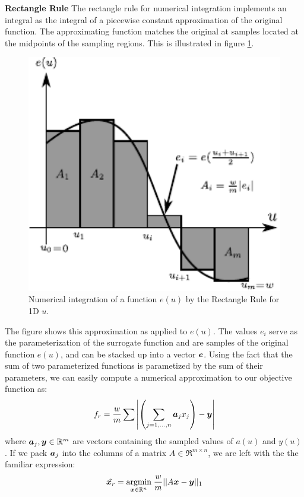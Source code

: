 \documentclass[12pt,journal,draftcls,letterpaper,onecolumn]{IEEEtran}
\begin{document}
{\bf Rectangle Rule} The rectangle rule for numerical integration implements an integral as the integral of a piecewise constant approximation of the original function.  The approximating function matches the original at samples located at the midpoints of the sampling regions. This is illustrated in figure \ref{fig:rectangle}.
\begin{figure}
 \centering
 \includegraphics[width=5in]{integration_rectangle_midpoint.pdf}
 \caption{Numerical integration of a function $e(u)$ by the Rectangle Rule for 1D $u$.}
 \label{fig:rectangle}
\end{figure}
The figure shows this approximation as applied to $e(u)$. The values $e_i$ serve as the parameterization of the surrogate function and are samples of the original function $e(u)$, and can be stacked up into a vector $\boldsymbol{e}$.  Using the fact that the sum of two parameterized functions is parametized by the sum of their parameters, we can easily compute a numerical approximation to our objective function as:
\begin{equation}\label{eqn:discrete1DBox}
f_r = \frac{w}{m} \sum{ \left|\left(\sum_{j=1,\ldots,n} \boldsymbol{a}_j x_j\right) - {\boldsymbol{y}}\right|}
\end{equation}
where $\boldsymbol{a}_j, {\boldsymbol{y}} \in \mathbb R^m$ are vectors containing the sampled values of $a(u)$ and $y(u)$.  If we pack $\boldsymbol{a}_j$ into the columns of a matrix $A \in \Re^{m \times n}$, we are left with the the familiar expression:
\begin{equation}\label{eqn:original_optimization}
\tilde{{\boldsymbol{x}}_r} = {\hbox{$\underset{{\boldsymbol{x}}\in \mathbb R^n}{\mbox{argmin}}\;$}} \frac{w}{m} || A {\boldsymbol{x}} - {\boldsymbol{y}} ||_1
\end{equation}
\end{document}
